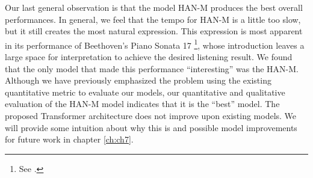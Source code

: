 Our last general observation is that the \vnet{} model HAN-M produces the best overall performances. In general, we feel that the tempo for HAN-M is a little too slow, but it still creates the most natural expression. This expression is most apparent in its performance of Beethoven's Piano Sonata 17%
\footnote{See \href{https://ui.neptune.ai/richt3211/thesis/e/THESIS-162/artifacts}{}.}, whose introduction leaves a large space for interpretation to achieve the desired listening result. We found that the only model that made this performance ``interesting'' was the HAN-M. Although we have previously emphasized the problem using the existing quantitative metric to evaluate our models, our quantitative and qualitative evaluation of the HAN-M model indicates that it is the ``best'' model. The proposed Transformer architecture does not improve upon existing models. We will provide some intuition about why this is and possible model improvements for future work in chapter \ref{ch:ch7}.






